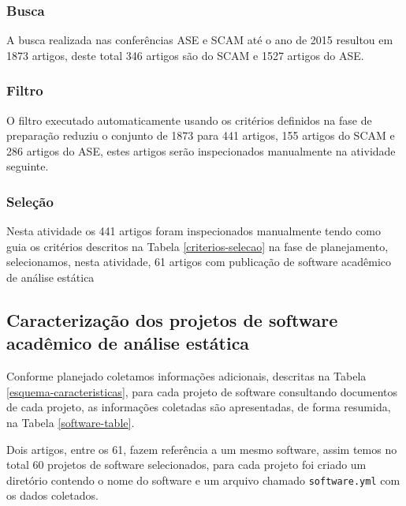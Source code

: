 \subsubsection{Busca}

A busca realizada nas conferências ASE e SCAM até o ano de 2015 resultou em
1873 artigos, deste total 346 artigos são do SCAM e 1527 artigos do ASE.


\subsubsection{Filtro}

O filtro executado automaticamente usando os critérios definidos na fase de
preparação reduziu o conjunto de 1873 para 441 artigos, 155 artigos do SCAM e
286 artigos do ASE, estes artigos serão inspecionados manualmente na atividade
seguinte.

\subsubsection{Seleção}

Nesta atividade os 441 artigos foram inspecionados manualmente tendo como guia
os critérios descritos na Tabela \ref{criterios-selecao} na fase de
planejamento, selecionamos, nesta atividade, 61 artigos com publicação de
software acadêmico de análise estática

\subsection{Caracterização dos projetos de software acadêmico de análise estática}

Conforme planejado coletamos informações adicionais, descritas na Tabela
\ref{esquema-caracteristicas}, para cada projeto de software consultando
documentos de cada projeto, as informações coletadas são apresentadas, de forma
resumida, na Tabela \ref{software-table}.



Dois artigos, entre os 61, fazem referência a um mesmo software, assim temos no
total 60 projetos de software selecionados, para cada projeto foi criado um
diretório contendo o nome do software e um arquivo chamado
\texttt{software.yml} com os dados coletados.

